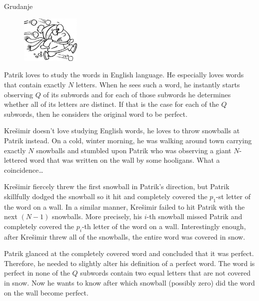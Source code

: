 \begin{statement}[
  problempoints=70,
  timelimit=1 second,
  memorylimit=512 MiB,
]{Grudanje}

\setlength\intextsep{-0.1cm}
\begin{figure}
\centering
\includegraphics[width=0.25\textwidth]{img/gruda.png}
\end{figure}


Patrik loves to study the words in English language. He especially loves words
that contain exactly $N$ letters. When he sees such a word, he instantly starts
observing $Q$ of its subwords and for each of those subwords he determines
whether all of its letters are distinct. If that is the case for each of the
$Q$ subwords, then he considers the original word to be perfect.

  Krešimir doesn't love studying English words, he loves to throw snowballs at
Patrik instead. On a cold, winter morning, he was walking around town
carrying exactly $N$ snowballs and stumbled upon Patrik who was observing a
giant $N$-lettered word that was written on the wall by some hooligans.  What
a coincidence\dots

Krešimir fiercely threw the first snowball in Patrik's direction, but Patrik
skillfully dodged the snowball so it hit and completely
covered the $p_1$-st letter of the word on a wall. In a similar manner,
Krešimir failed to hit Patrik with the next $(N-1)$ snowballs. More precisely,
his $i$-th snowball missed Patrik and completely covered the $p_i$-th letter
of the word on a wall. Interestingly enough, after Krešimir threw all of the
snowballs, the entire word was covered in snow.

Patrik glanced at the completely covered word and concluded that it was perfect.
Therefore, he needed to slightly alter his definition of a perfect word. The
word is perfect in none of the $Q$ subwords contain two equal letters that are
not covered in snow. Now he wants to know after which snowball (possibly
zero) did the word on the wall become perfect.


\end{statement}
